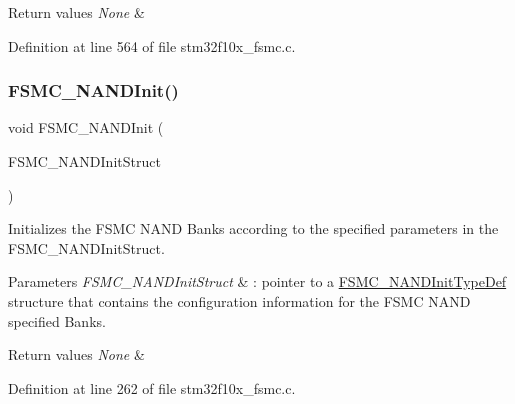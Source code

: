 \begin{DoxyRetVals}{Return values}
{\em None} & \\
\hline
\end{DoxyRetVals}


Definition at line 564 of file stm32f10x\+\_\+fsmc.\+c.

\mbox{\label{group___f_s_m_c___exported___functions_ga9f81ccc4e126c11f1eb33077b1a68e6f}} 
\subsubsection{\texorpdfstring{F\+S\+M\+C\+\_\+\+N\+A\+N\+D\+Init()}{FSMC\_NANDInit()}}
{\footnotesize\ttfamily void F\+S\+M\+C\+\_\+\+N\+A\+N\+D\+Init (\begin{DoxyParamCaption}\item[{\hyperlink{struct_f_s_m_c___n_a_n_d_init_type_def}{F\+S\+M\+C\+\_\+\+N\+A\+N\+D\+Init\+Type\+Def} $\ast$}]{F\+S\+M\+C\+\_\+\+N\+A\+N\+D\+Init\+Struct }\end{DoxyParamCaption})}



Initializes the F\+S\+MC N\+A\+ND Banks according to the specified parameters in the F\+S\+M\+C\+\_\+\+N\+A\+N\+D\+Init\+Struct. 


\begin{DoxyParams}{Parameters}
{\em F\+S\+M\+C\+\_\+\+N\+A\+N\+D\+Init\+Struct} & \+: pointer to a \hyperlink{struct_f_s_m_c___n_a_n_d_init_type_def}{F\+S\+M\+C\+\_\+\+N\+A\+N\+D\+Init\+Type\+Def} structure that contains the configuration information for the F\+S\+MC N\+A\+ND specified Banks. \\
\hline
\end{DoxyParams}

\begin{DoxyRetVals}{Return values}
{\em None} & \\
\hline
\end{DoxyRetVals}


Definition at line 262 of file stm32f10x\+\_\+fsmc.\+c.

\mbox{\label{group___f_s_m_c___exported___functions_ga8283ad94ad8e83d49d5b77d1c7e17862}} 
